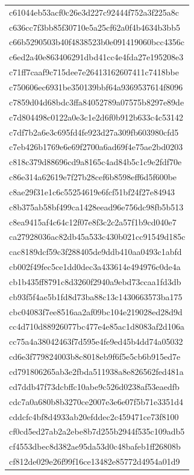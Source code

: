 \begin{tabular}{l}
c61044eb53acf0c26e3d227c92444f752a3f225a8c \\
c636cc7f3bb85f30710e5a25cf62a0f4b4634b3bb5 \\
c66b5290503b40f4838523b0e091419060bcc4356c \\
c6ed2a40e863406291dbd41cc4e4fda27e195208e3 \\
c71ff7caaf9c715dee7e26413162607411c7418bbe \\
c750606ec6931be350139bbf64a9369537614f8096 \\
c7859d04d68bdc3ffa84052789a07575b8297e89de \\
c7d804498c0122a0e3c1e2d6f0b912b633c4c53142 \\
c7df7b2a6e3c695fd4fe923d27a309fb603980cfd5 \\
c7eb426b1769e6e69f2700a6ad69f4e75ae2bd0203 \\
c818c379d88696cd9a8165c4ad84b5c1c9e2fdf70e \\
c86e314a62619e7f27b28cef6b8598eff6d5f600be \\
c8ae29f31e1c6c55254619e6fcf51bf24f27e84943 \\
c8b375ab58bf499ca1428eead96e756dc98fb5b513 \\
c8ea9415af4c64c12f07e8f3c2c2a57f1b9cd040e7 \\
ca27928036ac82db45a533c430b021cc91549d185c \\
cac8189dcf59c3f288405de9ddb410aa0493c1abfd \\
cb002f49fec5ce1dd0dec3a433614e494976c0de4a \\
cb1b435ff8791c8d3260f2940a9ebd73ccaa1fd3db \\
cb93f5f4ae5b1fd8d73ba88c13c1430663573ba175 \\
cbc04083f7ee8516aa2af09bc104e219028ed28d9d \\
cc4d710d88926077bc477e4e85ac1d8083af2d106a \\
cc75a4a38042463f7d595e4fe9ed45b4dd74a05032 \\
cd6e3f779824003b8c8018eb9f6f5e5cb6b915ed7e \\
cd791806265ab3e2fbda511938a8e826562fed481a \\
cd7ddb47f73dcbffc10abe9c526d0238af53eaedfb \\
cdc7a0a680b8b3270ce2007e3e6e07f5b71e3351d4 \\
cddcfc4bf8d4933ab20efddec2c459471ce73f8100 \\
cf0cd5ed27ab2a2ebe8b7d255b2944f535c109adb5 \\
cf4553dbec8d382ae95da53d0c48bafeb1ff26808b \\
cf812de029e26f99f16ce13482e85772d4954a01d9 \\

\end{tabular}
